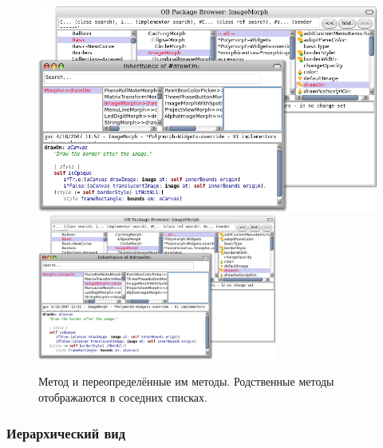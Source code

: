 \documentclass[a4paper,10pt,twoside]{book}
\begin{document}
\begin{figure}[btp]
	\begin{center}
   \ifluluelse
		{\includegraphics[width=\textwidth]{OBInheritanceOverriding}}
		{\includegraphics[width=0.7\textwidth]{OBInheritanceOverriding}}
	\end{center}
	\caption{Метод  и переопределённые им методы. Родственные методы отображаются в соседних списках.}
\end{figure}

\subsubsection{Иерархический вид}

\end{document}
